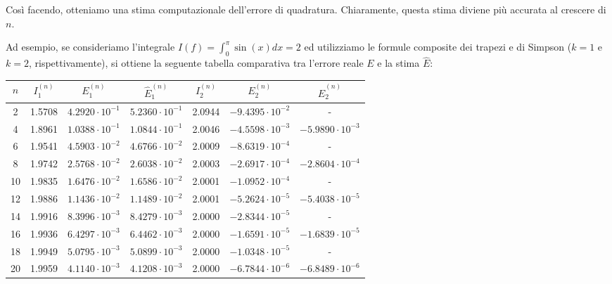 Così facendo, otteniamo una stima computazionale dell'errore di quadratura. Chiaramente, questa stima diviene più accurata al crescere di $n$.

Ad esempio, se consideriamo l'integrale $I(f) = \int_{0}^{\pi} \sin(x) dx = 2$ ed utilizziamo le formule composite dei trapezi e di Simpson ($k=1$ e $k=2$, rispettivamente), si ottiene la seguente tabella comparativa tra l'errore reale $E$ e la stima $\hat{E}$:

\begin{table}[htbp]
\centering
\renewcommand{\arraystretch}{1.2}
\small
\begin{tabular}{ccccccc}
\toprule
$n$ & $I_1^{(n)}$ & $E_1^{(n)}$ & $\hat{E}_1^{(n)}$ & $I_2^{(n)}$ & $E_2^{(n)}$ & $\hat{E}_2^{(n)}$ \\
\midrule
2 & 1.5708 & $4.2920 \cdot 10^{-1}$ & $5.2360 \cdot 10^{-1}$ & 2.0944 & $-9.4395 \cdot 10^{-2}$ & - \\
4 & 1.8961 & $1.0388 \cdot 10^{-1}$ & $1.0844 \cdot 10^{-1}$ & 2.0046 & $-4.5598 \cdot 10^{-3}$ & $-5.9890 \cdot 10^{-3}$ \\
6 & 1.9541 & $4.5903 \cdot 10^{-2}$ & $4.6766 \cdot 10^{-2}$ & 2.0009 & $-8.6319 \cdot 10^{-4}$ & - \\
8 & 1.9742 & $2.5768 \cdot 10^{-2}$ & $2.6038 \cdot 10^{-2}$ & 2.0003 & $-2.6917 \cdot 10^{-4}$ & $-2.8604 \cdot 10^{-4}$ \\
10 & 1.9835 & $1.6476 \cdot 10^{-2}$ & $1.6586 \cdot 10^{-2}$ & 2.0001 & $-1.0952 \cdot 10^{-4}$ & - \\
12 & 1.9886 & $1.1436 \cdot 10^{-2}$ & $1.1489 \cdot 10^{-2}$ & 2.0001 & $-5.2624 \cdot 10^{-5}$ & $-5.4038 \cdot 10^{-5}$ \\
14 & 1.9916 & $8.3996 \cdot 10^{-3}$ & $8.4279 \cdot 10^{-3}$ & 2.0000 & $-2.8344 \cdot 10^{-5}$ & - \\
16 & 1.9936 & $6.4297 \cdot 10^{-3}$ & $6.4462 \cdot 10^{-3}$ & 2.0000 & $-1.6591 \cdot 10^{-5}$ & $-1.6839 \cdot 10^{-5}$ \\
18 & 1.9949 & $5.0795 \cdot 10^{-3}$ & $5.0899 \cdot 10^{-3}$ & 2.0000 & $-1.0348 \cdot 10^{-5}$ & - \\
20 & 1.9959 & $4.1140 \cdot 10^{-3}$ & $4.1208 \cdot 10^{-3}$ & 2.0000 & $-6.7844 \cdot 10^{-6}$ & $-6.8489 \cdot 10^{-6}$ \\
\bottomrule
\end{tabular}
\end{table}


\vspace{0.8cm}
